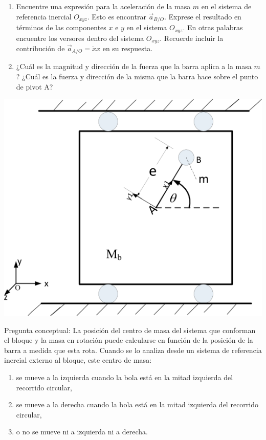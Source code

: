 \documentclass[11pt,spanish,a4paper]{article}
\begin{document}
\begin{enumerate}
\begin{minipage}[t][9cm]{0.65\textwidth}
\begin{enumerate}[label=\alph*)]
	\item Encuentre una expresión para la aceleración de la masa $m$ en el sistema de referencia inercial $O_{xyz}$.
	Esto es encontrar $\vec{a}_{B/O}$.
	Exprese el resultado en términos de las componentes $x$ e $y$ en el sistema $O_{xyz}$.
	En otras palabras encuentre los versores dentro del sistema $O_{xyz}$.
	Recuerde incluir la contribución de $\vec{a}_{A/O}= \ddot{x} \hat{x}$ en su respuesta.
	\item ¿Cuál es la magnitud y dirección de la fuerza que la barra aplica a la masa $m$?
	¿Cuál es la fuerza y dirección de la misma que la barra hace sobre el punto de pivot A?
\end{enumerate}
\end{minipage}
\begin{minipage}[c][0cm][t]{0.3\textwidth}
	\includegraphics[width=\textwidth]{MIT2_003SCF11_pset2_figure5}
\end{minipage}
Pregunta conceptual:
La posición del centro de masa del sistema que conforman el bloque y la masa en rotación puede calcularse en función de la posición de la barra a medida que esta rota.
Cuando se lo analiza desde un sistema de referencia inercial externo al bloque, este centro de masa: 
\begin{enumerate}[label=\alph*),itemjoin={,\quad}]
	\item se mueve a la izquierda cuando la bola está en la mitad izquierda del recorrido circular,
	\item se mueve a la derecha cuando la bola está en la mitad izquierda del recorrido circular,
	\item o no se mueve ni a izquierda ni a derecha.
\end{enumerate}



\end{enumerate}
\end{document}
